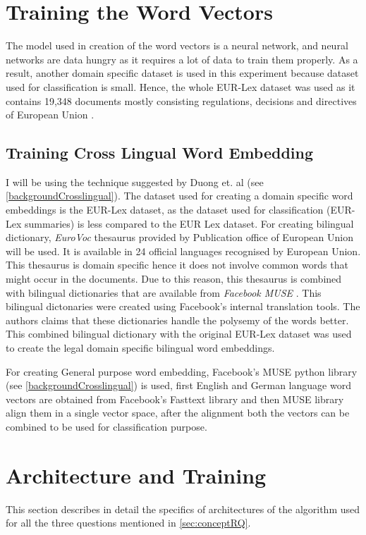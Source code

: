\section{Training the Word Vectors}

The model used in creation of the word vectors is a neural network, and neural networks are data hungry as it requires a lot of data to train them properly. As a result, another domain specific dataset is used in this experiment because dataset used for classification is small. Hence, the whole EUR-Lex dataset was used as it contains 19,348 documents mostly consisting regulations, decisions and directives of European Union \cite{jf:SemanticLaw}.

\subsection{Training Cross Lingual Word Embedding}\label{implementationCrossLingual}

I will be using the technique suggested by Duong et. al \cite{duong-EtAl:2016:EMNLP} (see \ref{backgroundCrosslingual}).
The dataset used for creating a domain specific word embeddings is the EUR-Lex dataset, as the dataset used for classification (EUR-Lex summaries) is less compared to the EUR Lex dataset. For creating bilingual dictionary, \textit{EuroVoc} thesaurus \cite{steinberger2002cross} provided by Publication office of European Union will be used. It is available in 24 official languages recognised by European Union. This thesaurus is domain specific hence it does not involve common words that might occur in the documents. Due to this reason, this thesaurus is combined with bilingual dictionaries that are available from \textit{Facebook MUSE} \cite{conneau2017word}. This bilingual dictonaries were created using Facebook's internal translation tools. The authors claims that these dictionaries handle the polysemy of the words better. This combined bilingual dictionary with the original EUR-Lex dataset was used to create the legal domain specific bilingual word embeddings. 

For creating General purpose word embedding, Facebook's MUSE python library \cite{conneau2017word} (see \ref{backgroundCrosslingual}) is used, first English and German language word vectors are obtained from Facebook's Fasttext library and then MUSE library align them in a single vector space, after the alignment both the vectors can be combined to be used for classification purpose. 


\section{Architecture and Training}
This section describes in detail the specifics of architectures of the algorithm used for all the three questions mentioned in \ref{sec:conceptRQ}.

